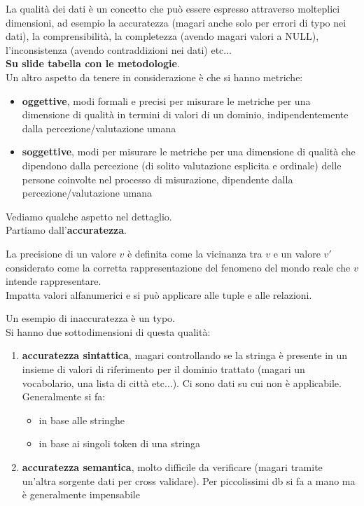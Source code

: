 \documentclass[a4paper,12pt, oneside]{book}
\begin{document}
La qualità dei dati è un concetto che può essere espresso attraverso molteplici
dimensioni, ad esempio la accuratezza (magari anche solo per errori di typo nei
dati), la comprensibilità, la completezza (avendo magari valori a NULL),
l'inconsistenza (avendo contraddizioni nei dati) etc$\ldots$\\  
\textbf{Su slide tabella con le metodologie}.\\
Un altro aspetto da tenere in considerazione è che si hanno metriche:
\begin{itemize}
  \item \textbf{oggettive}, modi formali e precisi per misurare le metriche per
  una dimensione di qualità in termini di valori di un dominio,
  indipendentemente dalla percezione/valutazione umana 
  \item \textbf{soggettive}, modi per misurare le metriche per una dimensione di
  qualità che dipendono dalla percezione (di solito valutazione esplicita e
  ordinale) delle persone coinvolte nel processo di misurazione, dipendente
  dalla percezione/valutazione umana 
\end{itemize}
Vediamo qualche aspetto nel dettaglio.\\
Partiamo dall'\textbf{accuratezza}.
\begin{definizione}
  La precisione di un valore $v$ è definita come la vicinanza tra $v$ e un
  valore $v'$ considerato come la corretta rappresentazione del fenomeno del
  mondo reale che $v$ intende rappresentare.\\
  Impatta valori alfanumerici e si può applicare alle tuple e alle relazioni.
\end{definizione}
Un esempio di inaccuratezza è un typo.\\
Si hanno due sottodimensioni di questa qualità:
\begin{enumerate}
  \item \textbf{accuratezza sintattica}, magari controllando se la stringa è
  presente in un insieme di valori di riferimento per il dominio trattato
  (magari un vocabolario, una lista di città etc$\ldots$). Ci sono dati su cui
  non è applicabile. Generalmente si fa:
  \begin{itemize}
    \item in base alle stringhe
    \item in base ai singoli token di una stringa
  \end{itemize}
  \item \textbf{accuratezza semantica}, molto difficile da verificare (magari
  tramite un'altra sorgente dati per cross validare). Per piccolissimi db si fa
  a mano ma è generalmente impensabile
\end{enumerate}
\end{document}
